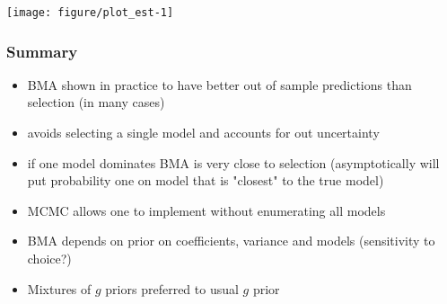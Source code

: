 \documentclass{beamer}\usepackage[]{graphicx}\usepackage[]{color}
\makeatletter
\def\maxwidth{ %
  \ifdim\Gin@nat@width>\linewidth
    \linewidth
  \else
    \Gin@nat@width
  \fi
}
\newenvironment{knitrout}{}{} %
\makeatother
\begin{document}
\begin{frame}[fragile] %
\begin{knitrout}
\color{fgcolor}

{\centering \texttt{[image: figure/plot\_est-1]} 

}



\end{knitrout}
\end{frame}

\begin{frame} \frametitle{Summary}

\begin{itemize}
\item BMA shown in practice to have better out of sample predictions than selection (in many cases) \pause
\item avoids selecting a single model and accounts for out uncertainty \pause
\item if one model dominates BMA is very close to selection  (asymptotically will put probability one on model that is "closest" to the true model) \pause
\item MCMC allows one to implement without enumerating all models \pause
\item BMA depends on prior on coefficients, variance and models  (sensitivity to choice?) \pause
\item Mixtures of $g$ priors preferred to usual $g$ prior
\end{itemize}
\end{frame}
\end{document}
